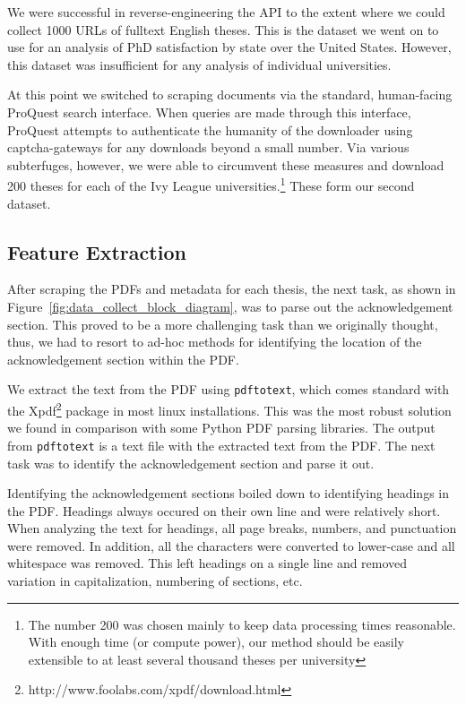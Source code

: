 We were successful in reverse-engineering the API to the extent where we could collect 1000 URLs of fulltext English theses. This is the dataset we went on to use for an analysis of PhD satisfaction by state over the United States. However, this dataset was insufficient for any analysis of individual universities.

At this point we switched to scraping documents via the standard, human-facing ProQuest search interface. When queries are made through this interface, ProQuest attempts to authenticate the humanity of the downloader using captcha-gateways for any downloads beyond a small number. Via various subterfuges, however, we were able to circumvent these measures and download 200 theses for each of the Ivy League universities.\footnote{The number 200 was chosen mainly to keep data processing times reasonable. With enough time (or compute power), our method should be easily extensible to at least several thousand theses per university} These form our second dataset.

\subsection*{Feature Extraction}

After scraping the PDFs and metadata for each thesis, the next task, as shown in Figure~\ref{fig:data_collect_block_diagram}, was to parse out the acknowledgement section.  This proved to be a more challenging task than we originally thought, thus, we had to resort to ad-hoc methods for identifying the location of the acknowledgement section within the PDF.

We extract the text from the PDF using \texttt{pdftotext}, which comes standard with the Xpdf\footnote{http://www.foolabs.com/xpdf/download.html} package in most linux installations.  This was the most robust solution we found in comparison with some Python PDF parsing libraries.  The output from \texttt{pdftotext} is a text file with the extracted text from the PDF.  The next task was to identify the acknowledgement section and parse it out.

Identifying the acknowledgement sections boiled down to identifying headings in the PDF.  Headings always occured on their own line and were relatively short.  When analyzing the text for headings, all page breaks, numbers, and punctuation were removed.  In addition, all the characters were converted to lower-case and all whitespace was removed.  This left headings on a single line and removed variation in capitalization, numbering of sections, etc.  

